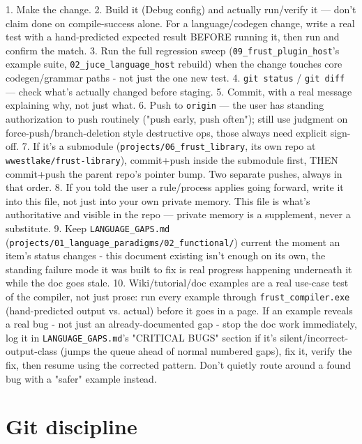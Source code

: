 \documentclass{book}
\begin{document}
1. Make the change.
2. Build it (Debug config) and actually run/verify it — don't claim done on compile-success alone. For a language/codegen change, write a real test with a hand-predicted expected result BEFORE running it, then run and confirm the match.
3. Run the full regression sweep (\texttt{09_frust_plugin_host}'s example suite, \texttt{02_juce_language_host} rebuild) when the change touches core codegen/grammar paths - not just the one new test.
4. \texttt{git status} / \texttt{git diff} — check what's actually changed before staging.
5. Commit, with a real message explaining why, not just what.
6. Push to \texttt{origin} — the user has standing authorization to push routinely ("push early, push often"); still use judgment on force-push/branch-deletion style destructive ops, those always need explicit sign-off.
7. If it's a submodule (\texttt{projects/06_frust_library}, its own repo at \texttt{wwestlake/frust-library}), commit+push inside the submodule first, THEN commit+push the parent repo's pointer bump. Two separate pushes, always in that order.
8. If you told the user a rule/process applies going forward, write it into this file, not just into your own private memory. This file is what's authoritative and visible in the repo — private memory is a supplement, never a substitute.
9. Keep \texttt{LANGUAGE_GAPS.md} (\texttt{projects/01_language_paradigms/02_functional/}) current the moment an item's status changes - this document existing isn't enough on its own, the standing failure mode it was built to fix is real progress happening underneath it while the doc goes stale.
10. Wiki/tutorial/doc examples are a real use-case test of the compiler, not just prose: run every example through \texttt{frust_compiler.exe} (hand-predicted output vs. actual) before it goes in a page. If an example reveals a real bug - not just an already-documented gap - stop the doc work immediately, log it in \texttt{LANGUAGE_GAPS.md}'s "CRITICAL BUGS" section if it's silent/incorrect-output-class (jumps the queue ahead of normal numbered gaps), fix it, verify the fix, then resume using the corrected pattern. Don't quietly route around a found bug with a "safer" example instead.

\section{Git discipline}
\end{document}
